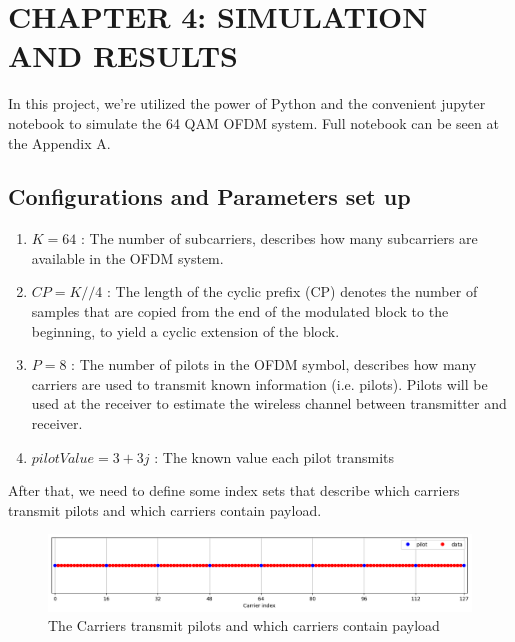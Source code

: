 \section*{CHAPTER 4: SIMULATION AND RESULTS}
\setcounter{section}{4}
\setcounter{subsection}{0}
\setcounter{figure}{0}
\setcounter{table}{0}

In this project, we're utilized the power of Python and the convenient jupyter notebook to simulate the 64 QAM OFDM system. Full notebook can be seen at the Appendix A.

\subsection{Configurations and Parameters set up}

\begin{enumerate}
    \item $K = 64$ : The number of subcarriers, describes how many subcarriers are available in the OFDM system.
    \item $CP = K//$4 : The length of the cyclic prefix (CP) denotes the number of samples that are copied from the end of the modulated block to the beginning, to yield a cyclic extension of the block.
    \item $P = 8$ : The number of pilots in the OFDM symbol, describes how many carriers are used to transmit known information (i.e. pilots). Pilots will be used at the receiver to estimate the wireless channel between transmitter and receiver.
    \item $pilotValue = 3+3j$ : The known value each pilot transmits
\end{enumerate}

After that, we need to define some index sets that describe which carriers transmit pilots and which carriers contain payload.

\begin{figure}[htbp]
    \centering
    \includegraphics[width=\linewidth]{../Source/results/carrier_index}
    \caption{The Carriers transmit pilots and which carriers contain payload}
\end{figure}

